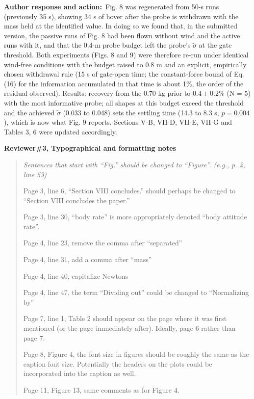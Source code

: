 \documentclass[11pt]{article}
\newcommand{\concern}[1]{\par\medskip\noindent\colorbox{gray!12}{\parbox{\dimexpr\linewidth-2\fboxsep}{\textbf{#1}}}\par\smallskip}
\newcommand{\rlabel}[1]{\par\textbf{#1}\ }
\begin{document}
\rlabel{Author response and action:}Fig. 8 was regenerated from 50-s runs (previously 35 s), showing 34 s of hover after the probe is withdrawn with the mass held at the identified value. In doing so we found that, in the submitted version, the passive runs of Fig. 8 had been flown without wind and the active runs with it, and that the 0.4-m probe budget left the probe's $\tilde\sigma$ at the gate threshold. Both experiments (Figs. 8 and 9) were therefore re-run under identical wind-free conditions with the budget raised to 0.8 m and an explicit, empirically chosen withdrawal rule (15 s of gate-open time; the constant-force bound of Eq. (16) for the information accumulated in that time is about 1\%, the order of the residual observed). Results: recovery from the 0.70-kg prior to $0.4 \pm 0.2$\% (N = 5) with the most informative probe; all shapes at this budget exceed the threshold and the achieved $\tilde\sigma$ (0.033 to 0.048) sets the settling time (14.3 to 8.3 s, $p = 0.004$), which is now what Fig. 9 reports. Sections V-B, VII-D, VII-E, VII-G and Tables 3, 6 were updated accordingly.

\concern{Reviewer\#3, Typographical and formatting notes}

\begin{quote}\itshape Sentences that start with ``Fig.'' should be changed to ``Figure''. (e.g., p. 2, line 53)\par Page 3, line 6, ``Section VIII concludes.'' should perhaps be changed to ``Section VIII concludes the paper.''\par Page 3, line 30, ``body rate'' is more appropriately denoted ``body attitude rate''.\par Page 4, line 23, remove the comma after ``separated''\par Page 4, line 31, add a comma after ``mass''\par Page 4, line 40, capitalize Newtons\par Page 4, line 47, the term ``Dividing out'' could be changed to ``Normalizing by''\par Page 7, line 1, Table 2 should appear on the page where it was first mentioned (or the page immediately after). Ideally, page 6 rather than page 7.\par Page 8, Figure 4, the font size in figures should be roughly the same as the caption font size. Potentially the headers on the plots could be incorporated into the caption as well.\par Page 11, Figure 13, same comments as for Figure 4.\end{quote}
\end{document}
